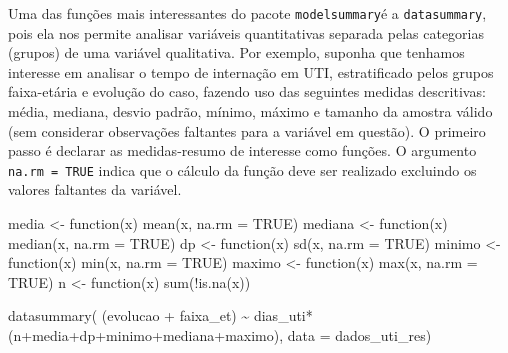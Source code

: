 \documentclass[
  letterpaper,
  DIV=11,
  numbers=noendperiod]{scrreprt}
\newenvironment{Shaded}{\begin{snugshade}}{\end{snugshade}}
\newcommand{\AttributeTok}[1]{\textcolor[rgb]{0.40,0.45,0.13}{#1}}
\newcommand{\ConstantTok}[1]{\textcolor[rgb]{0.56,0.35,0.01}{#1}}
\newcommand{\ControlFlowTok}[1]{\textcolor[rgb]{0.00,0.23,0.31}{#1}}
\newcommand{\FunctionTok}[1]{\textcolor[rgb]{0.28,0.35,0.67}{#1}}
\newcommand{\NormalTok}[1]{\textcolor[rgb]{0.00,0.23,0.31}{#1}}
\newcommand{\OtherTok}[1]{\textcolor[rgb]{0.00,0.23,0.31}{#1}}
\newcommand{\SpecialCharTok}[1]{\textcolor[rgb]{0.37,0.37,0.37}{#1}}
\begin{document}
Uma das funções mais interessantes do pacote \texttt{modelsummary}é a
\texttt{datasummary}, pois ela nos permite analisar variáveis
quantitativas separada pelas categorias (grupos) de uma variável
qualitativa. Por exemplo, suponha que tenhamos interesse em analisar o
tempo de internação em UTI, estratificado pelos grupos faixa-etária e
evolução do caso, fazendo uso das seguintes medidas descritivas: média,
mediana, desvio padrão, mínimo, máximo e tamanho da amostra válido (sem
considerar observações faltantes para a variável em questão). O primeiro
passo é declarar as medidas-resumo de interesse como funções. O
argumento \texttt{na.rm\ =\ TRUE} indica que o cálculo da função deve
ser realizado excluindo os valores faltantes da variável.

\begin{Shaded}
\begin{Highlighting}[]
\NormalTok{media }\OtherTok{\textless{}{-}} \ControlFlowTok{function}\NormalTok{(x)   }\FunctionTok{mean}\NormalTok{(x, }\AttributeTok{na.rm =} \ConstantTok{TRUE}\NormalTok{)}
\NormalTok{mediana }\OtherTok{\textless{}{-}} \ControlFlowTok{function}\NormalTok{(x) }\FunctionTok{median}\NormalTok{(x, }\AttributeTok{na.rm =} \ConstantTok{TRUE}\NormalTok{)}
\NormalTok{dp }\OtherTok{\textless{}{-}} \ControlFlowTok{function}\NormalTok{(x) }\FunctionTok{sd}\NormalTok{(x, }\AttributeTok{na.rm =} \ConstantTok{TRUE}\NormalTok{)}
\NormalTok{minimo }\OtherTok{\textless{}{-}} \ControlFlowTok{function}\NormalTok{(x) }\FunctionTok{min}\NormalTok{(x, }\AttributeTok{na.rm =} \ConstantTok{TRUE}\NormalTok{)}
\NormalTok{maximo }\OtherTok{\textless{}{-}} \ControlFlowTok{function}\NormalTok{(x) }\FunctionTok{max}\NormalTok{(x, }\AttributeTok{na.rm =} \ConstantTok{TRUE}\NormalTok{)}
\NormalTok{n }\OtherTok{\textless{}{-}} \ControlFlowTok{function}\NormalTok{(x) }\FunctionTok{sum}\NormalTok{(}\SpecialCharTok{!}\FunctionTok{is.na}\NormalTok{(x))}
\end{Highlighting}
\end{Shaded}

\begin{Shaded}
\begin{Highlighting}[]
\FunctionTok{datasummary}\NormalTok{( (evolucao }\SpecialCharTok{+}\NormalTok{ faixa\_et) }\SpecialCharTok{\textasciitilde{}}
\NormalTok{              dias\_uti}\SpecialCharTok{*}\NormalTok{(n}\SpecialCharTok{+}\NormalTok{media}\SpecialCharTok{+}\NormalTok{dp}\SpecialCharTok{+}\NormalTok{minimo}\SpecialCharTok{+}\NormalTok{mediana}\SpecialCharTok{+}\NormalTok{maximo), }\AttributeTok{data =}\NormalTok{ dados\_uti\_res)}
\end{Highlighting}
\end{Shaded}
\end{document}
